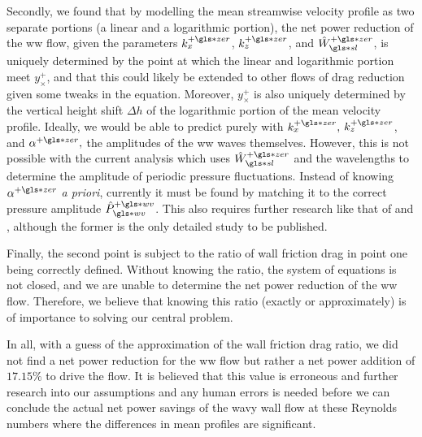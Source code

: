 Secondly, we found that by modelling the mean streamwise velocity profile as two separate portions (a linear and a logarithmic portion), the net power reduction of the \gls*{ww} flow, given the parameters $k_x\pz$,  $k_z\pz$, and  $\hat{W}\pz\ssl$, is uniquely determined by the point at which the linear and logarithmic portion meet $y_{\times}^{+}$, and that this could likely be extended to other flows of drag reduction given some tweaks in the equation. Moreover, $y_{\times}^{+}$ is also uniquely determined by the vertical height shift $\Delta h$ of the logarithmic portion of the mean velocity profile. Ideally, we would be able to predict purely with $k_x\pz,$  $k_z\pz$, and  $\alpha\pz,$ the amplitudes of the  \gls*{ww} waves themselves. However, this is not possible with the current analysis which uses $\hat{W}\pz\ssl$ and the wavelengths to determine the amplitude of periodic pressure fluctuations. Instead of knowing $\alpha\pz$ \textit{a priori}, currently it must be found by matching it to the correct pressure amplitude  $\hat{P}\pw\ww$. This also requires further research like that of \textcite{ghebali2017} and \textcite{denison2015}, although the former is the only detailed study to be published.

Finally, the second point is subject to the ratio of wall friction drag in point one being correctly defined. Without knowing the ratio, the system of equations is not closed, and we are unable to determine the net power reduction of the \gls*{ww} flow. Therefore, we believe that knowing this ratio (exactly or approximately) is of importance to solving our central problem.

In all, with a guess of the approximation of the wall friction drag ratio, we did not find a net power reduction for the \gls*{ww} flow but rather a net power addition of $17.15\%$ to drive the flow. It is believed that this value is erroneous and further research into our assumptions and any human errors is needed before we can conclude the actual net power savings of the wavy wall flow at these Reynolds numbers where the differences in mean profiles are significant.

